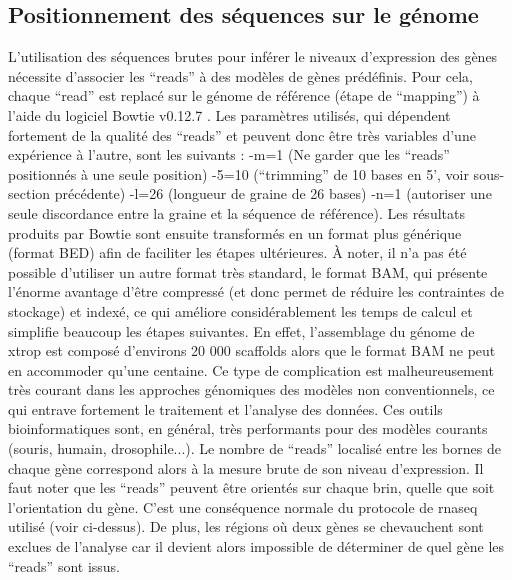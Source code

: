 \documentclass[../main.tex]{subfiles}
\begin{document}
	\subsection{Positionnement des séquences sur le génome}
		L'utilisation des séquences brutes pour inférer le niveaux d'expression des gènes nécessite d'associer les ``reads'' à des modèles de gènes prédéfinis.
		Pour cela, chaque ``read'' est replacé sur le génome de référence (étape de ``mapping'') à l'aide du logiciel Bowtie v0.12.7 \citep{Langmead2009}. Les paramètres utilisés, qui dépendent fortement de la qualité des ``reads'' et peuvent donc être très variables d'une expérience à l'autre, sont les suivants : -m=1 (Ne garder que les ``reads'' positionnés à une seule position) -5=10 (``trimming'' de 10 bases en 5', voir sous-section précédente) -l=26 (longueur de graine de 26 bases) -n=1 (autoriser une seule discordance entre la graine et la séquence de référence).
		Les résultats produits par Bowtie sont ensuite transformés en un format plus générique (format BED) afin de faciliter les étapes ultérieures.
		À noter, il n'a pas été possible d'utiliser un autre format très standard, le format BAM, qui présente l'énorme avantage d'être compressé (et donc permet de réduire les contraintes de stockage) et indexé, ce qui améliore considérablement les temps de calcul et simplifie beaucoup les étapes suivantes.
		En effet, l'assemblage du génome de \gls{xtrop} est composé d'environs 20 000 scaffolds alors que le format BAM ne peut en accommoder qu'une centaine.
		Ce type de complication est malheureusement très courant dans les approches génomiques des modèles non conventionnels, ce qui entrave fortement le traitement et l'analyse des données.
		Ces outils bioinformatiques sont, en général, très performants pour des modèles courants (souris, humain, drosophile...).
		Le nombre de ``reads'' localisé entre les bornes de chaque gène correspond alors à la mesure brute de son niveau d'expression. 
		Il faut noter que les ``reads'' peuvent être orientés sur chaque brin, quelle que soit l'orientation du gène.
		C'est une conséquence normale du protocole de \gls{rnaseq} utilisé (voir ci-dessus).
		De plus, les régions où deux gènes se chevauchent sont exclues de l'analyse car il devient alors impossible de déterminer de quel gène les ``reads'' sont issus.
\end{document}
